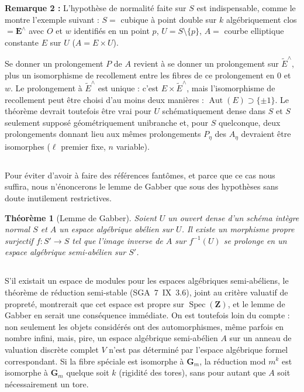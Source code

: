\documentclass[12pt,a4paper]{article}
\theoremstyle{plain}
\newtheorem{theorem}{Théorème}[section]
\theoremstyle{definition}
\theoremstyle{remark}
\DeclareMathOperator{\Aut}{Aut}
\DeclareMathOperator{\Spec}{Spec}
\begin{document}
\textbf{Remarque 2 :} L'hypothèse de normalité faite sur $S$ est indispensable, comme le montre l'exemple suivant : $S =$ cubique à point double sur $k$ algébriquement clos $= \mathbf{E}^\wedge$ avec $O$ et $w$ identifiés en un point $p$, $U = S \setminus \{p\}$, $A =$ courbe elliptique constante $E$ sur $U$ ($A = E \times U$).

Se donner un prolongement $P$ de $A$ revient à se donner un prolongement sur $\widetilde{E}^\wedge$, plus un isomorphisme de recollement entre les fibres de ce prolongement en $0$ et $w$. Le prolongement à $\widetilde{E}^\wedge$ est unique : c'est $E \times \widetilde{E}^\wedge$, mais l'isomorphisme de recollement peut être choisi d'au moins deux manières : $\Aut(E) \supset \{\pm 1\}$. Le théorème devrait toutefois être vrai pour $U$ schématiquement dense dans $S$ et $S$ seulement supposé géométriquement unibranche et, pour $S$ quelconque, deux prolongements donnant lieu aux mêmes prolongements $P_\eta$ des $A_\eta$ devraient être isomorphes ($\ell$ premier fixe, $n$ variable).

\subsection{} Pour éviter d'avoir à faire des références fantômes, et parce que ce cas nous suffira, nous n'énoncerons le lemme de Gabber que sous des hypothèses sans doute inutilement restrictives.

\begin{theorem}[Lemme de Gabber]
Soient $U$ un ouvert dense d'un schéma intègre normal $S$ et $A$ un espace algébrique abélien sur $U$. Il existe un morphisme propre surjectif $f : S' \to S$ tel que l'image inverse de $A$ sur $f^{-1}(U)$ se prolonge en un espace algébrique semi-abélien sur $S'$.
\end{theorem}

\subsection{} S'il existait un espace de modules pour les espaces algébriques semi-abéliens, le théorème de réduction semi-stable (SGA~7~IX~3.6), joint au critère valuatif de propreté, montrerait que cet espace est propre sur $\Spec(\mathbf{Z})$, et le lemme de Gabber en serait une conséquence immédiate. On est toutefois loin du compte : non seulement les objets considérés ont des automorphismes, même parfois en nombre infini, mais, pire, un espace algébrique semi-abélien $A$ sur un anneau de valuation discrète complet $V$ n'est pas déterminé par l'espace algébrique formel correspondant. Si la fibre spéciale est isomorphe à $\mathbf{G}_m$, la réduction mod $m^k$ est isomorphe à $\mathbf{G}_m$ quelque soit $k$ (rigidité des tores), sans pour autant que $A$ soit nécessairement un tore.
\end{document}
